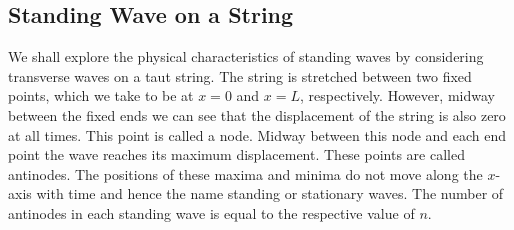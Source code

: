\documentclass[../../../main.tex]{subfiles}
\begin{document}
\subsection{Standing Wave on a String}
We shall explore the physical characteristics of standing waves by considering transverse waves on a taut string. The string is stretched between two fixed points, which we take to be at $x = 0$ and $x = L$, respectively. However, midway between the fixed ends we can see that the displacement of the string is also zero at all times. This point is called a node. Midway between this node and each end point the wave reaches its maximum displacement. These points are called antinodes. The positions of these maxima and minima do not move along the $x$-axis with time and hence the name standing or stationary waves. The number of antinodes in each standing wave is equal to the respective value of $n$.
\begin{figure*}[h]
    \centering
\end{figure*}
\end{document}
